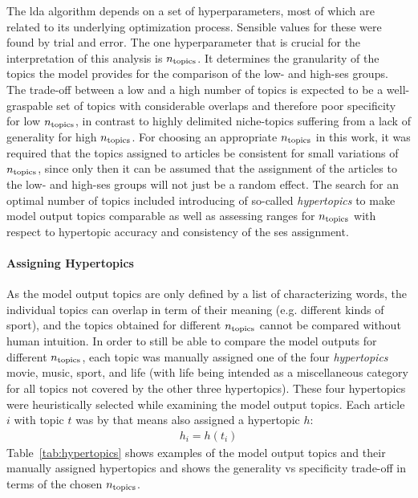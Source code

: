 The \gls{lda} algorithm depends on a set of hyperparameters, most of which are related to its underlying optimization process.  Sensible values for these were found by trial and error. The one hyperparameter that is crucial for the interpretation of this analysis is $n_\text{topics}$. It determines the granularity of the topics the model provides for the comparison of the low- and high-\gls{ses} groups. The trade-off between a low and a high number of topics is expected to be a well-graspable set of topics with considerable overlaps and therefore poor specificity for low $n_\text{topics}$, in contrast to highly delimited niche-topics suffering from a lack of generality for high $n_\text{topics}$. For choosing an appropriate $n_\text{topics}$ in this work, it was required that the topics assigned to articles be consistent for small variations of $n_\text{topics}$, since only then it can be assumed that the assignment of the articles to the low- and high-\gls{ses} groups will not just be a random effect. The search for an optimal number of topics included introducing of so-called \textit{hypertopics} to make model output topics comparable as well as assessing ranges for $n_\text{topics}$ with respect to hypertopic accuracy and consistency of the \gls{ses} assignment.

\paragraph{Assigning Hypertopics}
As the model output topics are only defined by a list of characterizing words, the individual topics can overlap in term of their meaning (e.g. different kinds of sport), and the topics obtained for different $n_\text{topics}$ cannot be compared without human intuition. In order to still be able to compare the model outputs for different $n_\text{topics}$, each topic was manually assigned one of the four \textit{hypertopics} movie, music, sport, and life (with life being intended as a miscellaneous category for all topics not covered by the other three hypertopics). These four hypertopics were heuristically selected while examining the model output topics. Each article $i$ with topic $t$ was by that means also assigned a hypertopic $h$:
\begin{align}
    h_i = h(t_i)
\end{align}
Table~\ref{tab:hypertopics} shows examples of the model output topics and their manually assigned hypertopics and shows the generality vs specificity trade-off in terms of the chosen $n_\text{topics}$.

